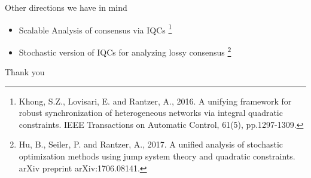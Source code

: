 \documentclass{beamer}
\begin{document}
\begin{frame}{Other directions we have in mind}
	\begin{itemize}
		\item Scalable Analysis of consensus via IQCs \footnote{Khong, S.Z., Lovisari, E. and Rantzer, A., 2016. A unifying framework for robust synchronization of heterogeneous networks via integral quadratic constraints. IEEE Transactions on Automatic Control, 61(5), pp.1297-1309.}
		\item Stochastic version of IQCs for analyzing lossy consensus \footnote{Hu, B., Seiler, P. and Rantzer, A., 2017. A unified analysis of stochastic optimization methods using jump system theory and quadratic constraints. arXiv preprint arXiv:1706.08141.}
	\end{itemize}
\end{frame}
\begin{frame}{}
\begin{center}
    \huge{Thank you}
\end{center}
\end{frame}
\end{document}
